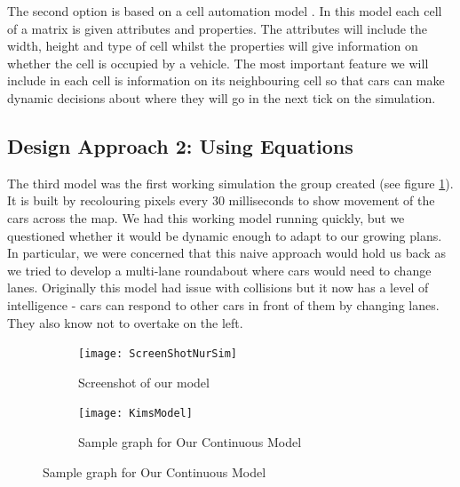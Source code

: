 \documentclass[11pt]{article}
\begin{document}
	
	The second option is based on a cell automation model \cite{namekawa2005general}. 
	In this model each cell of a matrix is given attributes and properties. 
	The attributes will include the width, height and type of cell whilst the properties will give information on whether the cell is occupied by a vehicle. 
	The most important feature we will include in each cell is information on its neighbouring cell so that cars can make dynamic decisions about where they will go in the next tick on the simulation.
	
	
	\subsection{Design Approach 2: Using Equations}
	\FloatBarrier
	
	
    The third model was the first working simulation the group created (see figure \ref{NurScreenshot}). 
    It is built by recolouring pixels every 30 milliseconds to show movement of the cars across the map. 
    We had this working model running quickly, but we questioned whether it would be dynamic enough to adapt to our growing plans. 
    In particular, we were concerned that this naive approach would hold us back as we tried to develop a multi-lane roundabout where cars would need to change lanes. 
    Originally this model had issue with collisions but it now has a level of intelligence - cars can respond to other cars in front of them by changing lanes. 
    They also know not to overtake on the left. 	
\begin{figure}
	
	\centering
	\begin{subfigure}{.35\textwidth}
		\centering
		\texttt{[image: ScreenShotNurSim]}
		\caption{Screenshot of  our model }
		\label{NurScreenshot}
	\end{subfigure}
	\begin{subfigure}{.35\textwidth}
		\centering
		\texttt{[image: KimsModel]}
		\caption{Sample graph for Our Continuous Model}
		\label{KimModel}
	\end{subfigure}
\end{figure}	
%		
\end{document}

